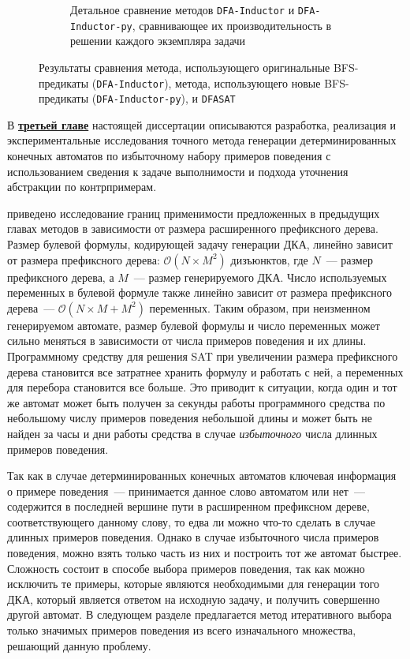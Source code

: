 \begin{figure}[ht]
\begin{subfigure}[b]{0,48\textwidth}
    \caption{Детальное сравнение методов \texttt{DFA-Inductor} и \texttt{DFA-Inductor-py}, сравнивающее их производительность в решении каждого экземпляра задачи}
    \label{syn:img:plots:scatter}
  \end{subfigure}
  \caption{Результаты сравнения метода, использующего оригинальные BFS-предикаты (\texttt{DFA-Inductor}), метода, использующего новые BFS-предикаты (\texttt{DFA-Inductor-py}), и \texttt{DFASAT}}
  \label{syn:img:plots}
\end{figure}


В \textbf{\underline{третьей главе}} настоящей диссертации описываются разработка, реализация и экспериментальные исследования точного метода генерации детерминированных конечных автоматов по избыточному набору примеров поведения с использованием сведения к задаче выполнимости и подхода уточнения абстракции по контрпримерам.

\insection{\ref{sec:cegar:motivation}} приведено исследование границ применимости предложенных в предыдущих главах методов в зависимости от размера расширенного префиксного дерева. 
Размер булевой формулы, кодирующей задачу генерации ДКА, линейно зависит от размера префиксного дерева: $\mathcal{O}\left(N \times M^{2}\right)$ дизъюнктов, где $N$~--- размер префиксного дерева, а $M$~--- размер генерируемого ДКА.
Число используемых переменных в булевой формуле также линейно зависит от размера префиксного дерева~--- $\mathcal{O}\left(N \times M + M^{2}\right)$ переменных.
Таким образом, при неизменном генерируемом автомате, размер булевой формулы и число переменных может сильно меняться в зависимости от числа примеров поведения и их длины.
Программному средству для решения SAT при увеличении размера префиксного дерева становится все затратнее хранить формулу и работать с ней, а переменных для перебора становится все больше.
Это приводит к ситуации, когда один и тот же автомат может быть получен за секунды работы программного средства по небольшому числу примеров поведения небольшой длины и может быть не найден за часы и дни работы средства в случае \emph{избыточного} числа длинных примеров поведения.

Так как в случае детерминированных конечных автоматов ключевая информация о примере поведения~--- принимается данное слово автоматом или нет~--- содержится в последней вершине пути в расширенном префиксном дереве, соответствующего данному слову, то едва ли можно что-то сделать в случае длинных примеров поведения.
Однако в случае избыточного числа примеров поведения, можно взять только часть из них и построить тот же автомат быстрее.
Сложность состоит в способе выбора примеров поведения, так как можно исключить те примеры, которые являются необходимыми для генерации того ДКА, который является ответом на исходную задачу, и получить совершенно другой автомат.
В следующем разделе предлагается метод итеративного выбора только значимых примеров поведения из всего изначального множества, решающий данную проблему.

